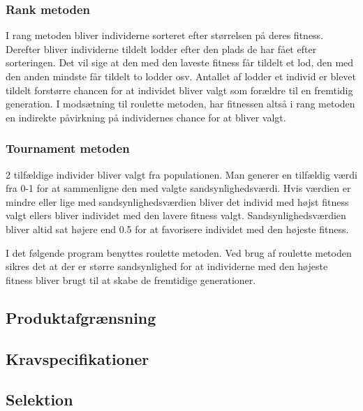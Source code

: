 \subsubsection{Rank metoden}

I rang metoden bliver individerne sorteret efter størrelsen på deres fitness. Derefter bliver individerne tildelt lodder efter den plads de har fået efter sorteringen. Det vil sige at den med den laveste fitness får tildelt et lod, den med den anden mindste får tildelt to lodder osv. Antallet af lodder et individ er blevet tildelt forstørre chancen for at individet bliver valgt som forældre til en fremtidig generation. I modsætning til roulette metoden, har fitnessen altså i rang metoden en indirekte påvirkning på individernes chance for at bliver valgt.\cite{jebari2013} 

\subsubsection{Tournament metoden}

2 tilfældige individer bliver valgt fra populationen. Man generer en tilfældig værdi fra 0-1 for at sammenligne den med valgte sandsynlighedsværdi. Hvis værdien er mindre eller lige med sandsynlighedsværdien bliver det individ med højst fitness valgt ellers bliver individet med den lavere fitness valgt. Sandsynlighedsværdien bliver altid sat højere end 0.5 for at favorisere individet med den højeste fitness\cite{jebari2013}. 

I det følgende program benyttes roulette metoden. Ved brug af roulette metoden sikres det at der er større sandsynlighed for at individerne med den højeste fitness bliver brugt til at skabe de fremtidige generationer. 

\subsection{Produktafgrænsning}
  

\subsection{Kravspecifikationer}
  

\subsection{Selektion}
  